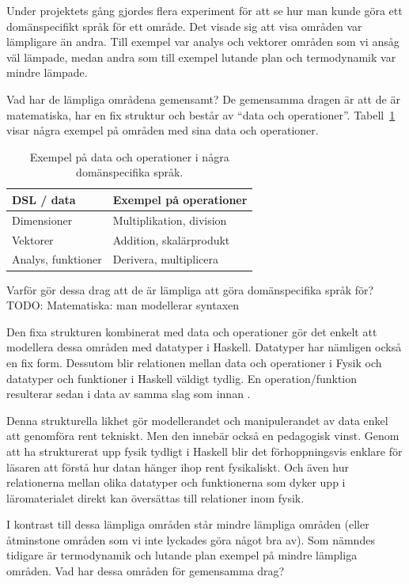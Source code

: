 \begin{binge}
Under projektets gång gjordes flera experiment för att se hur man kunde göra ett
domänspecifikt språk för ett område. Det visade sig att visa områden var
lämpligare än andra. Till exempel var analys och vektorer områden som vi ansåg
väl lämpade, medan andra som till exempel lutande plan och termodynamik var
mindre lämpade.

Vad har de lämpliga områdena gemensamt? De gemensamma dragen är att de är
matematiska, har en fix struktur och består av ``data och operationer''.
Tabell~\ref{tab:data_och_ops} visar några exempel på områden med sina data och
operationer.

\begin{table}[tph]
\centering
\caption{Exempel på data och operationer i några domänspecifika språk.}
\label{tab:data_och_ops}
\begin{tabular}{@{}l|l@{}}
\toprule
DSL / data & Exempel på operationer \\ \midrule
Dimensioner & Multiplikation, division \\
Vektorer & Addition, skalärprodukt \\
Analys, funktioner & Derivera, multiplicera \\ \bottomrule
\end{tabular}
\end{table}

Varför gör dessa drag att de är lämpliga att göra domänspecifika språk för?
TODO: Matematiska: man modellerar syntaxen

Den fixa strukturen kombinerat med data och operationer gör det enkelt att
modellera dessa områden med datatyper i Haskell. Datatyper har nämligen också en
fix form. Dessutom blir relationen mellan data och operationer i Fysik och
datatyper och funktioner i Haskell väldigt tydlig. En operation/funktion
resulterar sedan i data av samma slag som innan .

Denna strukturella likhet gör modellerandet och manipulerandet av data enkel att
genomföra rent tekniskt. Men den innebär också en pedagogisk vinst. Genom att ha
strukturerat upp fysik tydligt i Haskell blir det förhoppningsvis enklare för
läsaren att förstå hur datan hänger ihop rent fysikaliskt. Och även hur
relationerna mellan olika datatyper och funktionerna som dyker upp i
läromaterialet direkt kan översättas till relationer inom fysik.

I kontrast till dessa lämpliga områden står mindre lämpliga områden (eller
åtminstone områden som vi inte lyckades göra något bra av). Som nämndes tidigare
är termodynamik och lutande plan exempel på mindre lämpliga områden. Vad har
dessa områden för gemensamma drag?


\end{binge}
